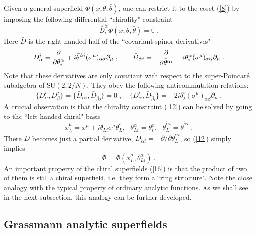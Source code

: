 \documentclass[a4paper,12pt]{article}
\begin{document}
Given a general superfield $\Phi(x,\theta,\bar\theta)$, one can 
restrict it to the coset (\ref{8}) by imposing the following 
differential ``chirality" constraint \cite{fwz} 
\begin{equation}\label{12}
  \bar D^{\dot\alpha}_i \Phi(x,\theta,\bar\theta) = 0\;.
\end{equation}
Here $\bar D$ is the right-handed half of the ``covariant spinor 
derivatives" 
\begin{equation}\label{13}
D^i_\alpha = {\partial\over 
\partial \theta^\alpha_i}+
i\bar\theta^{\dot\alpha i}(\sigma^\mu)_{\alpha\dot\alpha} 
\partial_\mu\;, \qquad
\bar D_{\dot\alpha i} = -{\partial\over \partial 
\bar\theta^{\dot\alpha i}}- i\theta^\alpha_i 
(\sigma^\mu)_{\alpha\dot\alpha} \partial_\mu\;. 
\end{equation}
Note that these derivatives are only covariant with respect to the 
super-Poincar\'{e} subalgebra of $\mbox{SU}(2,2/N)$. They obey the 
following anticommutation relations: 
\begin{equation}\label{14}
  \{D^i_\alpha,D^j_\beta\} = \{\bar D_{\dot\alpha i},\bar D_{\dot\beta j}\} =
  0\;, \quad \{D^i_\alpha,\bar D_{\dot\beta j}\} = -2i\delta^i_j
  (\sigma^\mu)_{\alpha\dot\beta}\partial_\mu\;.
\end{equation}
A crucial observation is that the chirality constraint (\ref{12}) 
can be solved by going to the ``left-handed chiral" basis 
\begin{equation}
x^\mu_L=x^\mu+i\theta_{Li}\sigma^\mu\bar\theta^i_L, \ \ \ 
\theta^\alpha_{Li} =\theta^\alpha_i,\ \ \ \bar\theta^{\dot\alpha 
i}_L = \bar\theta^{\dot\alpha i}\;. \label{15}
\end{equation} 
There $\bar D$ becomes just a partial derivative, $\bar 
D_{\dot\alpha i} = -\partial/\partial\bar\theta_L^{\dot\alpha i}$, 
so (\ref{12}) simply implies
\begin{equation}\label{16}
  \Phi=\Phi(x^\mu_L,\theta^\alpha_{Li})\;.
\end{equation}
An important property of the chiral superfields (\ref{16}) is that 
the product of two of them is still a chiral superfield, i.e. they 
form a ``ring structure". Note the close analogy with the typical 
property of ordinary analytic functions. As we shall see in the 
next subsection, this analogy can be further developed. 

\subsection{Grassmann analytic superfields}\label{gan}
\end{document}
